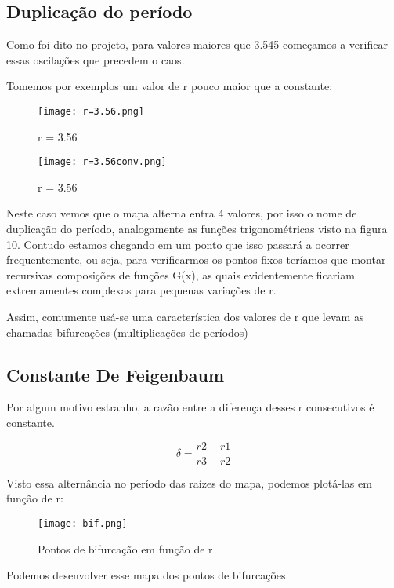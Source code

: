\documentclass[a4paper, 12pt]{article}
\begin{document}
\subsection{Duplicação do período}

Como foi dito no projeto, para valores maiores que 3.545 começamos a verificar essas oscilações que precedem o caos.

Tomemos por exemplos um valor de r pouco maior que a constante:

\begin{figure}[H]
    \centering
    \texttt{[image: r=3.56.png]}
    \caption{r = 3.56}
\end{figure}

\begin{figure}[H]
    \centering
    \texttt{[image: r=3.56conv.png]}
    \caption{r = 3.56}
\end{figure}

Neste caso vemos que o mapa alterna entra 4 valores, por isso o nome de duplicação do período, analogamente as funções trigonométricas visto na figura 10. Contudo estamos chegando em um ponto que isso passará a ocorrer frequentemente, ou seja, para verificarmos os pontos fixos teríamos que montar recursivas composições de funções G(x), as quais evidentemente ficariam extremamentes complexas para pequenas variações de r.

Assim, comumente usá-se uma característica dos valores de r que levam as chamadas bifurcações (multiplicações de períodos)

\subsection{Constante De Feigenbaum}

Por algum motivo estranho, a razão entre  a diferença desses r consecutivos é constante.

\begin{equation}
    \delta = \frac{r2 -r1 }{r3 - r2}
\end{equation}

Visto essa alternância no período das raízes do mapa, podemos plotá-las em função de r:

\begin{figure}[H]
    \centering
    \texttt{[image: bif.png]}
    \caption{Pontos de bifurcação em função de r}
\end{figure}

Podemos desenvolver esse mapa dos pontos de bifurcações.
\end{document}
